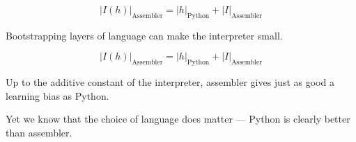 {$$|I(h)|_\mathrm{Assembler} = |h|_\mathrm{Python} + |I|_\mathrm{Assembler}$$

\vfill
Bootstrapping layers of language can make the interpreter small.



$$|I(h)|_\mathrm{Assembler} = |h|_\mathrm{Python} + |I|_\mathrm{Assembler}$$

\vfill
Up to the additive constant of the interpreter, assembler gives just as good a learning bias as Python.

\vfill
Yet we know that the choice of language does matter --- Python is clearly better than assembler.



}


